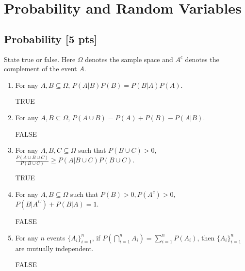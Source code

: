 \documentclass[a4paper]{article}
\theoremstyle{definition}
\newenvironment{soln}{
    \leavevmode\color{blue}\ignorespaces
}{}
\begin{document}
\section{Probability and Random Variables }
\subsection{Probability [5 pts]}
State true or false. Here $\Omega$ denotes the sample space and $A^c$ denotes the complement of the event $A$.
\begin{enumerate}
\item For any $A, B \subseteq \Omega$, $P(A|B)P(B) = P(B|A)P(A)$.\\
  \begin{soln}  
	
	TRUE

 \end{soln}

\item For any $A, B \subseteq \Omega$, $P(A \cup B) = P(A) + P(B) - P(A | B)$.\\         
  \begin{soln}  
	
	FALSE	

 \end{soln}

\item For any $A, B, C \subseteq \Omega$ such that $P(B \cup C) > 0$,
  $\frac{P(A \cup B \cup C)}{P(B \cup C)} \geq P(A | B \cup C) P(B \cup C)$.\\ \begin{soln}  

	TRUE

 \end{soln}


\item For any $A, B\subseteq\Omega$ such that $P(B) > 0, P(A^c) > 0$,
  $P(B|A^C) + P(B|A) = 1$.\\ 
  \begin{soln}  

	FALSE	

 \end{soln}


\item For any $n$ events $\{A_i\}_{i=1}^n$, if
  $P(\bigcap_{i=1}^n A_i) = \sum_{i=1}^n P(A_i)$, then
  $\{A_i\}_{i=1}^n$ are mutually independent.\\
  \begin{soln}  

	FALSE 
	
 \end{soln}
\end{enumerate}
\end{document}

